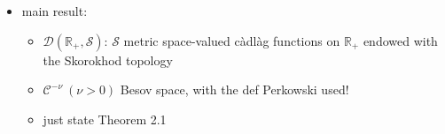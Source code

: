 \documentclass{report}
\theoremstyle{remark}
\theoremstyle{definition}
\begin{document}
\begin{itemize}
  \item main result:
  \begin{itemize}
    \item $\mathcal{D}(\mathbb{R}_+, \mathcal{S})$: $\mathcal{S}$ metric space-valued càdlàg functions on $\mathbb{R}_+$ endowed with the Skorokhod topology
    \item $\mathcal{C}^{-\nu}~(\nu > 0)$ Besov space, with the def Perkowski used!
    \item just state Theorem 2.1
  \end{itemize}
\end{itemize}
\end{document}
